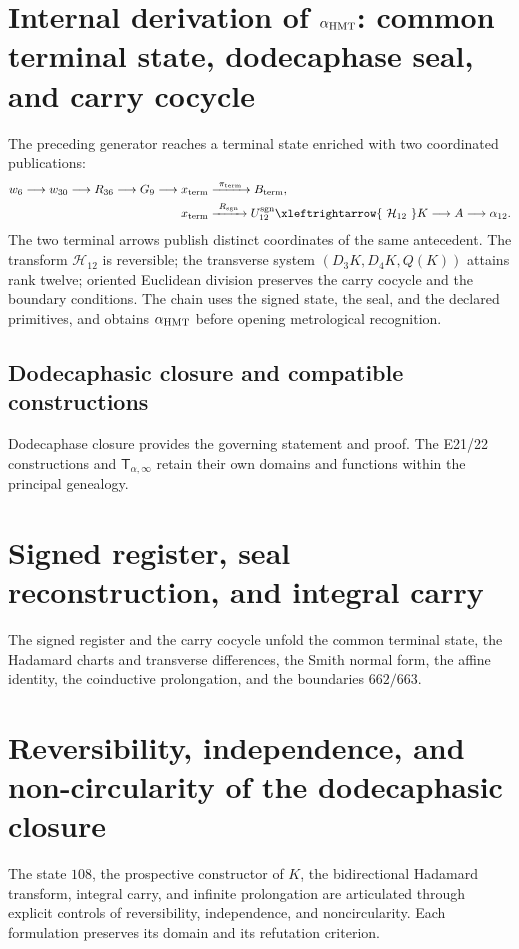 \label{chap:p3-83-25-alpha}

\section[Internal derivation of \texorpdfstring{\(\alpha_{\rm HMT}\)}{alpha HMT}]
{Internal derivation of \texorpdfstring{\(\alpha_{\rm HMT}\)}{alpha HMT}:
common terminal state, dodecaphase seal, and carry cocycle}
\label{p3-83-c25-s1:chap:parte-iii-alpha-hmt}

The preceding generator reaches a terminal state enriched with two
coordinated publications:
\[
\begin{aligned}
w_6\longrightarrow w_{30}\longrightarrow R_{36}\longrightarrow G_9
\longrightarrow x_{\rm term}
&\xrightarrow{\ \pi_{\rm term}\ }B_{\rm term},\\
x_{\rm term}
&\xrightarrow{\ R_{\rm sgn}\ }U_{12}^{\rm sgn}
\xleftrightarrow{\ \mathcal H_{12}\ }K
\longrightarrow A\longrightarrow\alpha_{12}.
\end{aligned}
\]
The two terminal arrows publish distinct coordinates of the same antecedent.
The transform \(\mathcal H_{12}\) is reversible; the transverse system
\((D_3K,D_4K,Q(K))\) attains rank twelve; oriented Euclidean division preserves
the carry cocycle and the boundary conditions. The chain uses the
signed state, the seal, and the declared primitives, and obtains
\(\alpha_{\rm HMT}\) before opening metrological recognition.

\subsection{Dodecaphasic closure and compatible constructions}
Dodecaphase closure provides the governing statement and proof. The
E21/22 constructions and \(\mathsf T_{\alpha,\infty}\) retain their own domains and
functions within the principal genealogy.


\section{Signed register, seal reconstruction, and integral carry}
The signed register and the carry cocycle unfold the common terminal state,
the Hadamard charts and transverse differences, the Smith normal form,
the affine identity, the coinductive prolongation, and the boundaries
\(662/663\).


\section{Reversibility, independence, and non-circularity of the dodecaphasic closure}
The state \(108\), the prospective constructor of \(K\), the bidirectional
Hadamard transform, integral carry, and infinite prolongation are
articulated through explicit controls of reversibility, independence, and
noncircularity. Each formulation preserves its domain and its
refutation criterion.


